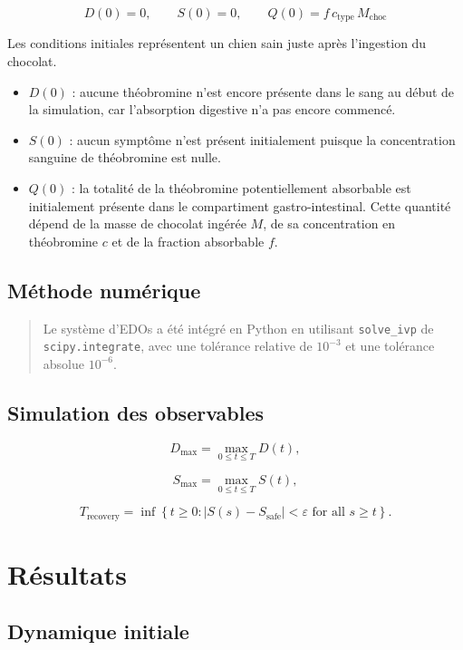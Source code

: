 \documentclass[11pt,a4paper]{article}
\begin{document}
\[
D(0)=0,
\qquad
S(0)=0,
\qquad
Q(0)=f\,c_{\mathrm{type}}\,M_{\mathrm{choc}}
\]

Les conditions initiales représentent un chien sain juste après l'ingestion du chocolat.
\begin{itemize}
    \item \(D(0)\) : aucune théobromine n'est encore présente dans le sang au début de la simulation, car l'absorption digestive n'a pas encore commencé.
    \item \(S(0)\) : aucun symptôme n'est présent initialement puisque la concentration sanguine de théobromine est nulle.
    \item \(Q(0)\) : la totalité de la théobromine potentiellement absorbable est initialement présente dans le compartiment gastro-intestinal. Cette quantité dépend de la masse de chocolat ingérée \(M\), de sa concentration en théobromine \(c\) et de la fraction absorbable \(f\).
\end{itemize}


\subsection{Méthode numérique}

\begin{quote}
Le système d'EDOs a été intégré en Python en utilisant \texttt{solve\_ivp} de
\texttt{scipy.integrate}, avec une tolérance relative de $10^{-3}$ et une tolérance absolue
$10^{-6}$.
\end{quote}



\subsection{Simulation des observables}


\[
D_{\max}
=
\max_{0\leq t\leq T}D(t),
\]

\[
S_{\max}
=
\max_{0\leq t\leq T}S(t),
\]

\[
T_{\mathrm{recovery}}
=
\inf
\left\{
t\geq 0:
|S(s)-S_{\mathrm{safe}}|<\varepsilon
\text{ for all }s\geq t
\right\}.
\]

\newpage
\section{Résultats}
\label{sec:results}

\subsection{Dynamique initiale}
\end{document}
